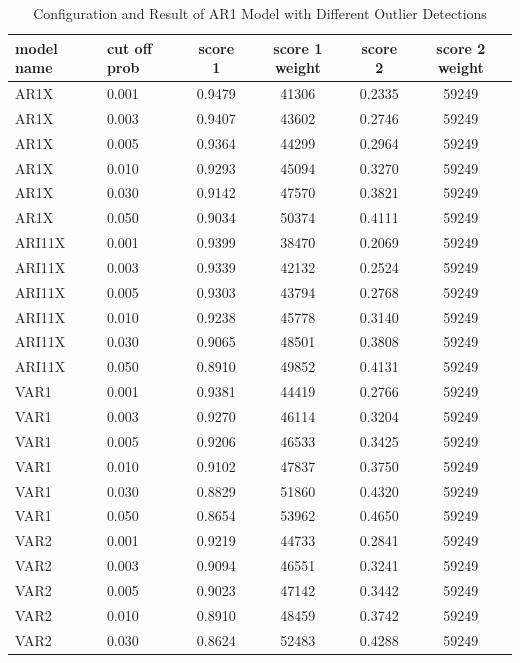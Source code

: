\documentclass{article}
\begin{document}
\begin{table}[htbp]
  \begin{center}
    \caption{Configuration and Result of AR1 Model with Different Outlier Detections}
    \label{tab:tab1.3.6}
    \begin{tabular}{l|l|*{4}{c}}
      \textbf{model name} & \textbf{cut off prob} & \textbf{score 1} & \textbf{score 1 weight} & \textbf{score 2} & \textbf{score 2 weight} \\
      \hline
      AR1X & 0.001 & 0.9479 & 41306 & 0.2335 & 59249\\
      AR1X & 0.003 & 0.9407 & 43602 & 0.2746 & 59249\\
      AR1X & 0.005 & 0.9364 & 44299 & 0.2964 & 59249\\
      AR1X & 0.010 & 0.9293 & 45094 & 0.3270 & 59249\\
      AR1X & 0.030 & 0.9142 & 47570 & 0.3821 & 59249\\
      AR1X & 0.050 & 0.9034 & 50374 & 0.4111 & 59249\\
      ARI11X & 0.001 & 0.9399 & 38470 & 0.2069 & 59249\\
      ARI11X & 0.003 & 0.9339 & 42132 & 0.2524 & 59249\\
      ARI11X & 0.005 & 0.9303 & 43794 & 0.2768 & 59249\\
      ARI11X & 0.010 & 0.9238 & 45778 & 0.3140 & 59249\\
      ARI11X & 0.030 & 0.9065 & 48501 & 0.3808 & 59249\\
      ARI11X & 0.050 & 0.8910 & 49852 & 0.4131 & 59249\\
      VAR1 & 0.001 & 0.9381 & 44419 & 0.2766 & 59249\\
      VAR1 & 0.003 & 0.9270 & 46114 & 0.3204 & 59249\\
      VAR1 & 0.005 & 0.9206 & 46533 & 0.3425 & 59249\\
      VAR1 & 0.010 & 0.9102 & 47837 & 0.3750 & 59249\\
      VAR1 & 0.030 & 0.8829 & 51860 & 0.4320 & 59249\\
      VAR1 & 0.050 & 0.8654 & 53962 & 0.4650 & 59249\\
      VAR2 & 0.001 & 0.9219 & 44733 & 0.2841 & 59249\\
      VAR2 & 0.003 & 0.9094 & 46551 & 0.3241 & 59249\\
      VAR2 & 0.005 & 0.9023 & 47142 & 0.3442 & 59249\\
      VAR2 & 0.010 & 0.8910 & 48459 & 0.3742 & 59249\\
      VAR2 & 0.030 & 0.8624 & 52483 & 0.4288 & 59249\\

\end{tabular}
\end{center}
\end{table}
\end{document}
